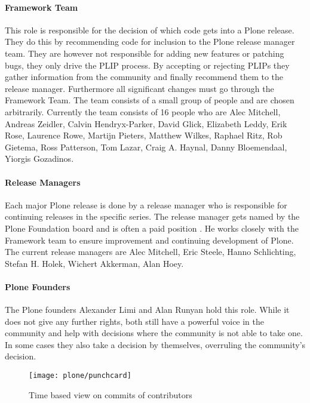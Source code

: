 \paragraph{Framework Team}

This role is responsible for the decision of which code gets into a Plone
release. They do this by recommending code for inclusion to the Plone release
manager team. They are however not responsible for adding new features or
patching bugs, they only drive the \ac{PLIP} process. By accepting or rejecting
\acp{PLIP} they gather information from the community and finally recommend
them to the release manager. Furthermore all significant changes must go
through the Framework Team. The team consists of a small group of people and
are chosen arbitrarily. Currently the team consists of 16 people who are Alec
Mitchell, Andreas Zeidler, Calvin Hendryx-Parker, David Glick, Elizabeth Leddy,
Erik Rose, Laurence Rowe, Martijn Pieters, Matthew Wilkes, Raphael Ritz, Rob
Gietema, Ross Patterson, Tom Lazar, Craig A. Haynal, Danny Bloemendaal, Yiorgis
Gozadinos.

\paragraph{Release Managers}

Each major Plone release is done by a release manager who is responsible for
continuing releases in the specific series. The release manager gets named by
the Plone Foundation board and is often a paid position
\cite{PlonePaidReleaseManager}. He works closely with the Framework team to
ensure improvement and continuing development of Plone. The current release
managers are Alec Mitchell, Eric Steele, Hanno Schlichting, Stefan H. Holek,
Wichert Akkerman, Alan Hoey.

\paragraph{Plone Founders}

The Plone founders Alexander Limi and Alan Runyan hold this role. While it does
not give any further rights, both still have a powerful voice in the community
and help with decisions where the community is not able to take one. In some
cases they also take a decision by themselves, overruling the community's
decision.

\begin{figure}[hbtp]
  \centering
  \texttt{[image: plone/punchcard]}
  \caption{Time based view on commits of contributors}
\end{figure}

